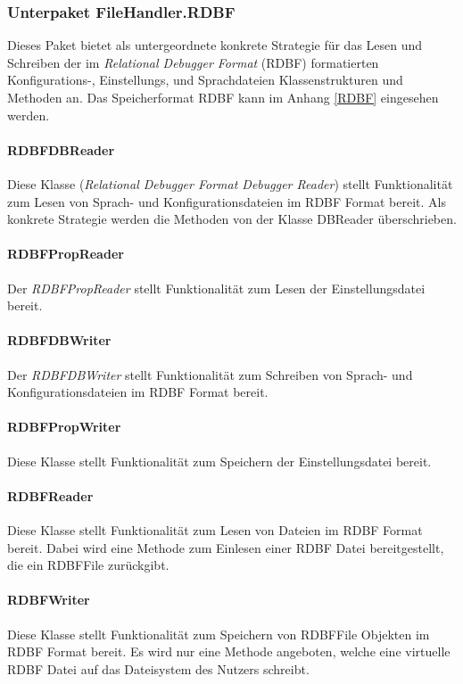 \documentclass[parskip=full]{scrartcl}
\begin{document}
\subsubsection{Unterpaket FileHandler.RDBF}
Dieses Paket bietet als untergeordnete konkrete Strategie für das Lesen und Schreiben der im \textit{Relational Debugger Format} (RDBF) formatierten Konfigurations-, Einstellungs, und Sprachdateien  Klassenstrukturen und Methoden an.
Das Speicherformat RDBF kann im Anhang \ref{RDBF} eingesehen werden.
\paragraph{RDBFDBReader}
Diese Klasse (\textit{Relational Debugger Format Debugger Reader}) stellt Funktionalität zum Lesen von Sprach- und Konfigurationsdateien im RDBF Format bereit.
Als konkrete Strategie werden die Methoden von der Klasse DBReader überschrieben.
\paragraph{RDBFPropReader}
Der \textit{RDBFPropReader} stellt Funktionalität zum Lesen der Einstellungsdatei bereit.
\paragraph{RDBFDBWriter}
Der \textit{RDBFDBWriter} stellt Funktionalität zum Schreiben von Sprach- und Konfigurationsdateien im RDBF Format bereit.
\paragraph{RDBFPropWriter}
Diese Klasse stellt Funktionalität zum Speichern der Einstellungsdatei bereit.

\paragraph{RDBFReader}
Diese Klasse stellt Funktionalität zum Lesen von Dateien im RDBF Format bereit.
Dabei wird eine Methode zum Einlesen einer RDBF Datei bereitgestellt, die ein RDBFFile zurückgibt.
\paragraph{RDBFWriter}
Diese Klasse stellt Funktionalität zum Speichern von RDBFFile Objekten im RDBF Format bereit.
Es wird nur eine Methode angeboten, welche eine virtuelle RDBF Datei auf das Dateisystem des Nutzers schreibt.
\end{document}
